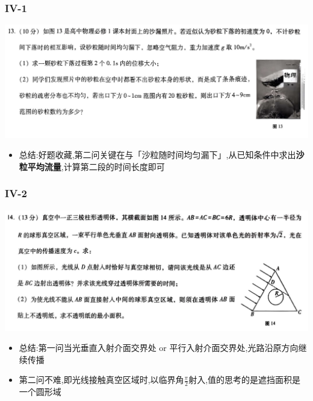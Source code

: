 \documentclass{article}
\begin{document}
        \subsubsection{IV-1}
        \includegraphics[width=50em,keepaspectratio]{./pictures/1.3-4.png}

        \begin{itemize}
            \item 总结:好题收藏,第二问关键在与「沙粒随时间均匀漏下」,从已知条件中求出\textbf{沙粒平均流量},计算第二段的时间长度即可
        \end{itemize}

        
        \subsubsection{IV-2}
        \includegraphics[width=50em,keepaspectratio]{./pictures/1.3-5.png}
        
        \begin{itemize}
            \item 总结:第一问当光垂直入射介面交界处 or 平行入射介面交界处,光路沿原方向继续传播
            \item 第二问不难,即光线接触真空区域时,以临界角$\frac{\pi}{2}$射入,值的思考的是遮挡面积是一个圆形域
        \end{itemize}

        
\end{document}
